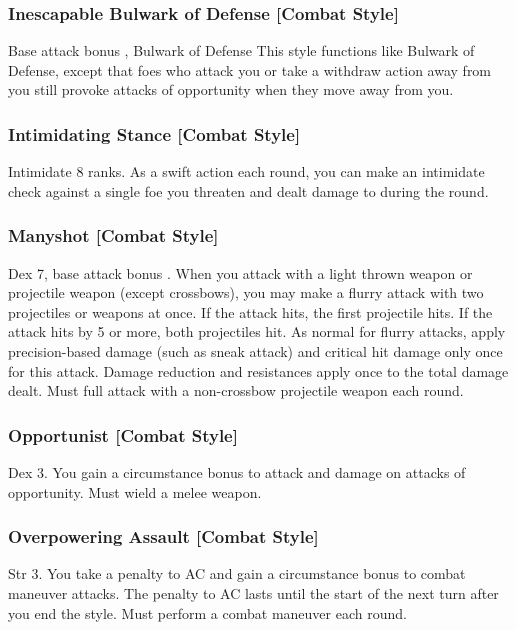 \subsubsection{Inescapable Bulwark of Defense [Combat Style]}
\featpre Base attack bonus , Bulwark of Defense
\featben This style functions like Bulwark of Defense, except that foes who attack you or take a withdraw action away from you still provoke attacks of opportunity when they move away from you.

\subsubsection{Intimidating Stance [Combat Style]}
 Intimidate 8 ranks.
 As a swift action each round, you can make an intimidate check against a single foe you threaten and dealt damage to during the round.

\subsubsection{Manyshot [Combat Style]}
 Dex 7, base attack bonus .
 When you attack with a light thrown weapon or projectile weapon (except crossbows), you may make a flurry attack with two projectiles or weapons at once. If the attack hits, the first projectile hits. If the attack hits by 5 or more, both projectiles hit. As normal for flurry attacks, apply precision-based damage (such as sneak attack) and critical hit damage only once for this attack. Damage reduction and resistances apply once to the total damage dealt.
 Must full attack with a non-crossbow projectile weapon each round.

\subsubsection{Opportunist [Combat Style]}
 Dex 3.
 You gain a  circumstance bonus to attack and damage on attacks of opportunity. \babscalingdescription
{} Must wield a melee weapon.

\subsubsection{Overpowering Assault [Combat Style]}
 Str 3.
 You take a  penalty to AC and gain a  circumstance bonus to combat maneuver attacks. \babscalingdescription The penalty to AC lasts until the start of the next turn after you end the style.
 Must perform a combat maneuver each round.

